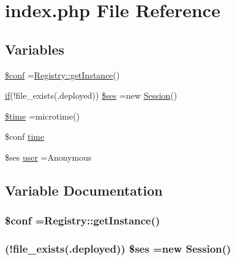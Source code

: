 \hypertarget{index_8php}{}\section{index.\+php File Reference}
\label{index_8php}
\subsection*{Variables}
\begin{DoxyCompactItemize}
\item 
\hyperlink{index_8php_ae4901046cc3e1deebf77ccc785384a78}{\$conf} =\hyperlink{classRegistry_af821839861bc43bc8a24f004be8534a7}{Registry\+::get\+Instance}()
\item 
\hyperlink{gmaps_8js_ab8cee96678df0427e480990f87d4b038}{if}(!file\+\_\+exists(\textquotesingle{}.deployed\textquotesingle{})) \hyperlink{index_8php_a17f408fb77ee79744bf65782847307dc}{\$ses} =new \hyperlink{classSession}{Session}()
\item 
\hyperlink{index_8php_a78db1a0602e3b6ac1d9a1b5ec103c160}{\$time} =microtime()
\item 
\$conf \hyperlink{index_8php_a13b3f51c9acf13beca6678d5e64b1f45}{time}
\item 
\$ses \hyperlink{index_8php_aef72c853e7fb9f27dec45808e8ef8df0}{user} =\textquotesingle{}Anonymous\textquotesingle{}
\end{DoxyCompactItemize}


\subsection{Variable Documentation}
\hypertarget{index_8php_ae4901046cc3e1deebf77ccc785384a78}{}
\subsubsection[{\$conf}]{\setlength{\rightskip}{0pt plus 5cm}\$conf ={\bf Registry\+::get\+Instance}()}\label{index_8php_ae4901046cc3e1deebf77ccc785384a78}
\hypertarget{index_8php_a17f408fb77ee79744bf65782847307dc}{}
\subsubsection[{\$ses}]{ (!file\+\_\+exists(\textquotesingle{}.deployed\textquotesingle{})) \$ses =new {\bf Session}()}\label{index_8php_a17f408fb77ee79744bf65782847307dc}
\hypertarget{index_8php_a78db1a0602e3b6ac1d9a1b5ec103c160}{}
